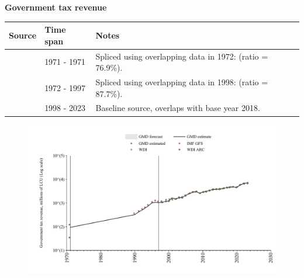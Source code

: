 \documentclass[12pt,a4paper,landscape]{article}
\begin{document}
\begin{adjustbox}{max totalsize={\paperwidth}{\paperheight},center}
\begin{minipage}[t][\textheight][t]{\textwidth}
\vspace*{0.5cm}
{}
\begin{center}
{\Large\bfseries Government tax revenue}
\end{center}
\vspace{0.5cm}
\begin{table}[H]
\centering
\small
\begin{tabular}{|l|l|l|}
\hline
\textbf{Source} & \textbf{Time span} & \textbf{Notes} \\
\hline
\rowcolor{white}\cite{GMD_estimated}& 1971 - 1971 &Spliced using overlapping data in 1972: (ratio = 76.9\%). \\
\rowcolor{lightgray}\cite{IMF_GFS}& 1972 - 1997 &Spliced using overlapping data in 1998: (ratio = 87.7\%). \\
\rowcolor{white}\cite{GMD_estimated}& 1998 - 2023 &Baseline source, overlaps with base year 2018. \\
\hline
\end{tabular}
\end{table}
\begin{figure}[H]
\centering
\includegraphics[width=\textwidth,height=0.6\textheight,keepaspectratio]{graphs/SLV_govtax.pdf}
\end{figure}
\end{minipage}
\end{adjustbox}
\end{document}

